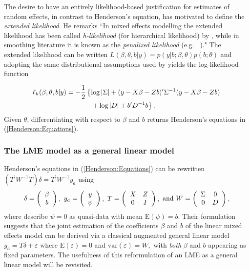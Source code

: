 \documentclass[12pt, a4paper]{report}
\theoremstyle{plain}
\theoremstyle{definition}
\theoremstyle{remark}
\begin{document}
The desire to have an entirely likelihood-based justification for estimates of random effects, in contrast to Henderson's equation, has motivated \citet[page 429]{Pawi:in:2001} to define the \emph{extended likelihood}. He remarks ``In mixed effects modelling the extended likelihood has been called \emph{h-likelihood} (for hierarchical  likelihood) by \cite{Lee:Neld:hier:1996}, while in smoothing literature it is known as the \emph{penalized likelihood} (e.g.\ \citeauthor{Gree:Silv:nonp:1994} \citeyear{Gree:Silv:nonp:1994})." The extended likelihood can be written $L(\beta,\theta,b|y) = p(y|b;\beta,\theta) p(b;\theta)$ and adopting the same distributional assumptions used by \cite{Henderson:1950} yields the log-likelihood function

\begin{eqnarray*}
\ell_h(\beta,\theta,b|y)
& = \displaystyle -\frac{1}{2} \left\{ \log|\Sigma| + (y - X \beta -Zb)'\Sigma^{-1}( y - X \beta -Zb) \right.\\
&  \hspace{0.5in} \left. + \log|D| + b^\prime D^{-1}b \right\}.
\end{eqnarray*}
Given $\theta$, differentiating with respect to $\beta$ and $b$ returns Henderson's equations in (\ref{Henderson:Equations}).

\subsubsection{The LME model as a general linear model}
Henderson's equations in (\ref{Henderson:Equations}) can be rewritten $( T^\prime W^{-1} T ) \delta = T^\prime W^{-1} y_{a} $ using
\[
\delta = \left(\begin{array}{c}\beta \\ b \end{array}\right),
\ y_{a} = \left(\begin{array}{c}
  y \cr \psi
  \end{array}\right),
\ T = \left(\begin{array}{cc}
  X & Z  \\
  0 & I
  \end{array}\right),
\ \textrm{and} \ W = \left(\begin{array}{cc}
  \Sigma & 0  \cr
  0 &  D \end{array}\right),
\]
where \cite{Lee:Neld:Pawi:2006} describe $\psi = 0$ as quasi-data with mean $\mathrm{E}(\psi) = b.$ Their formulation suggests that the joint estimation of the coefficients $\beta$ and $b$ of the linear mixed effects model can be derived via a classical augmented general linear model $y_{a} = T\delta + \varepsilon$ where $\mathrm{E}(\varepsilon) = 0$ and $\mathrm{var}(\varepsilon) = W,$ with \emph{both} $\beta$ and $b$ appearing as fixed parameters. The usefulness of this reformulation of an LME as a general linear model will be revisited.
\end{document}
